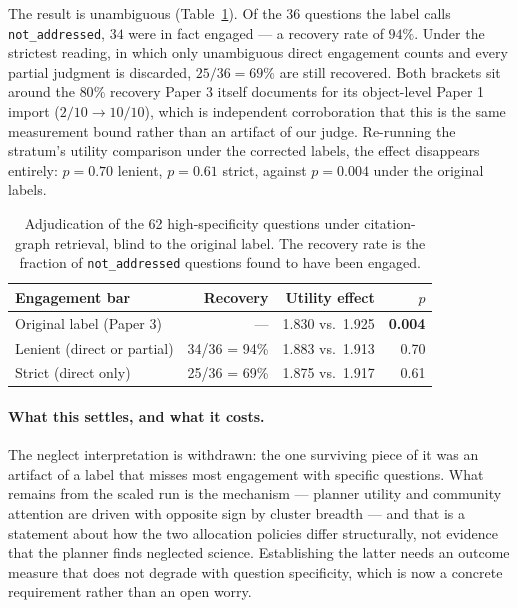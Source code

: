 \documentclass[11pt]{article}
\begin{document}
The result is unambiguous (Table~\ref{tab:adjudication}). Of the $36$
questions the label calls \texttt{not\_addressed}, $34$ were in fact
engaged --- a recovery rate of $94\%$. Under the strictest reading, in
which only unambiguous direct engagement counts and every partial
judgment is discarded, $25/36 = 69\%$ are still recovered. Both
brackets sit around the $80\%$ recovery Paper 3 itself documents for
its object-level Paper 1 import ($2/10 \to 10/10$), which is
independent corroboration that this is the same measurement bound
rather than an artifact of our judge. Re-running the stratum's utility
comparison under the corrected labels, the effect disappears entirely:
$p = 0.70$ lenient, $p = 0.61$ strict, against $p = 0.004$ under the
original labels.

\begin{table}[t]
\centering
\caption{Adjudication of the 62 high-specificity questions under
citation-graph retrieval, blind to the original label. The recovery
rate is the fraction of \texttt{not\_addressed} questions found to have
been engaged.}
\label{tab:adjudication}
\begin{tabular}{lrrr}
\toprule
Engagement bar & Recovery & Utility effect & $p$ \\
\midrule
Original label (Paper 3) & --- & 1.830 vs.\ 1.925 & \textbf{0.004} \\
Lenient (direct or partial) & 34/36 = 94\% & 1.883 vs.\ 1.913 & 0.70 \\
Strict (direct only) & 25/36 = 69\% & 1.875 vs.\ 1.917 & 0.61 \\
\bottomrule
\end{tabular}
\end{table}

\paragraph{What this settles, and what it costs.} The neglect
interpretation is withdrawn: the one surviving piece of it was an
artifact of a label that misses most engagement with specific
questions. What remains from the scaled run is the mechanism ---
planner utility and community attention are driven with opposite sign
by cluster breadth --- and that is a statement about how the two
allocation policies differ structurally, not evidence that the planner
finds neglected science. Establishing the latter needs an outcome
measure that does not degrade with question specificity, which is now a
concrete requirement rather than an open worry.
\end{document}

